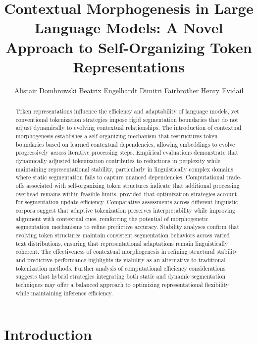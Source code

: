 \documentclass{article}
\title{Contextual Morphogenesis in Large Language Models: A Novel Approach to Self-Organizing Token Representations}
\author{
Alistair Dombrowski \And
Beatrix Engelhardt \And
Dimitri Fairbrother \And
	Henry Evidail 
}
\begin{document}
\maketitle


\begin{abstract}
Token representations influence the efficiency and adaptability of language models, yet conventional tokenization strategies impose rigid segmentation boundaries that do not adjust dynamically to evolving contextual relationships. The introduction of contextual morphogenesis establishes a self-organizing mechanism that restructures token boundaries based on learned contextual dependencies, allowing embeddings to evolve progressively across iterative processing steps. Empirical evaluations demonstrate that dynamically adjusted tokenization contributes to reductions in perplexity while maintaining representational stability, particularly in linguistically complex domains where static segmentation fails to capture nuanced dependencies. Computational trade-offs associated with self-organizing token structures indicate that additional processing overhead remains within feasible limits, provided that optimization strategies account for segmentation update efficiency. Comparative assessments across different linguistic corpora suggest that adaptive tokenization preserves interpretability while improving alignment with contextual cues, reinforcing the potential of morphogenetic segmentation mechanisms to refine predictive accuracy. Stability analyses confirm that evolving token structures maintain consistent segmentation behaviors across varied text distributions, ensuring that representational adaptations remain linguistically coherent. The effectiveness of contextual morphogenesis in refining structural stability and predictive performance highlights its viability as an alternative to traditional tokenization methods. Further analysis of computational efficiency considerations suggests that hybrid strategies integrating both static and dynamic segmentation techniques may offer a balanced approach to optimizing representational flexibility while maintaining inference efficiency.


\end{abstract}




\section{Introduction}
\end{document}
